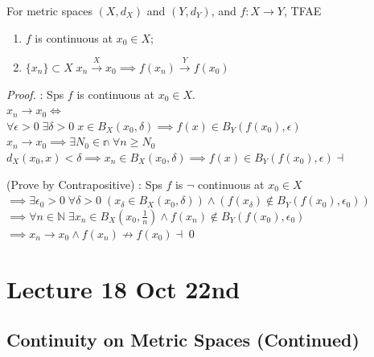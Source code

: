 \documentclass[notoc,notitlepage]{tufte-book}
\begin{document}
\begin{thm}\label{thm:sequential_characterization_of_continuity}
  For metric spaces $(X, d_X)$ and $(Y, d_Y)$, and $f : X \to Y$, TFAE
  \begin{enumerate}
    \item $f$ is continuous at $x_0 \in X$;
    \item $\{ x_n \} \subset X \; x_n \overset{X}{\to} x_0 \implies f(x_n) \overset{Y}{\to} f(x_0)$
  \end{enumerate}
\end{thm}

\begin{proof}
   : Sps $f$ is continuous at $x_0 \in X$. \\
  $x_n \to x_0 \iff$ \\
  $ \forall \epsilon > 0 \; \exists \delta > 0 \; x \in B_X(x_0, \delta) \implies f(x) \in B_Y(f(x_0), \epsilon)$ \\
  $x_n \to x_0 \implies \exists N_0 \in \mathbb{n} \; \forall n \geq N_0$ \\
  $d_X(x_0, x) < \delta \implies x_n \in B_X(x_0, \delta) \implies f(x) \in B_Y(f(x_0), \epsilon) \dashv$

  \noindent{} (Prove by Contrapositive) : Sps $f$ is $\neg$ continuous at $x_0 \in X$ \\
  $\implies \exists \epsilon_0 > 0 \; \forall \delta > 0 \; (x_\delta \in B_X(x_0, \delta)) \land (f(x_\delta) \notin B_Y(f(x_0), \epsilon_0))$ \\
  $\implies \forall n \in \mathbb{N} \; \exists x_n \in B_X\left(x_0, \frac{1}{n}\right) \land f(x_n) \notin B_Y(f(x_0), \epsilon_0)$ \\
  $\implies x_n \to x_0 \land f(x_n) \not\to f(x_0) \dashv$\qed\
\end{proof}



\chapter{Lecture 18 Oct 22nd}%
\label{chp:lecture_18_oct_22nd}

\section{Continuity on Metric Spaces (Continued)}%
\label{sec:continuity_on_metric_spaces_continued}
\end{document}
